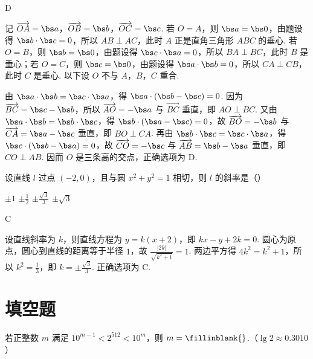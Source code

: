 \begin{answer}
D
\end{answer}

\begin{solution}
记 \(\overrightarrow{OA}=\bs a\)，\(\overrightarrow{OB}=\bs b\)，\(\overrightarrow{OC}=\bs c\). 若 \(O=A\)，则 \(\bs a=\bs0\)，由题设得 \(\bs b\cdot\bs c=0\)，所以 \(AB\perp AC\)，此时 \(A\) 正是直角三角形 \(ABC\) 的垂心. 若 \(O=B\)，则 \(\bs b=\bs0\)，由题设得 \(\bs c\cdot\bs a=0\)，所以 \(BA\perp BC\)，此时 \(B\) 是垂心；若 \(O=C\)，则 \(\bs c=\bs0\)，由题设得 \(\bs a\cdot\bs b=0\)，所以 \(CA\perp CB\)，此时 \(C\) 是垂心. 以下设 \(O\) 不与 \(A\)，\(B\)，\(C\) 重合.

由 \(\bs a\cdot\bs b=\bs c\cdot\bs a\)，得 \(\bs a\cdot(\bs b-\bs c)=0\). 因为 \(\overrightarrow{BC}=\bs c-\bs b\)，所以 \(\overrightarrow{AO}=-\bs a\) 与 \(\overrightarrow{BC}\) 垂直，即 \(AO\perp BC\). 又由 \(\bs a\cdot\bs b=\bs b\cdot\bs c\)，得 \(\bs b\cdot(\bs a-\bs c)=0\)，故 \(\overrightarrow{BO}=-\bs b\) 与 \(\overrightarrow{CA}=\bs a-\bs c\) 垂直，即 \(BO\perp CA\). 再由 \(\bs b\cdot\bs c=\bs c\cdot\bs a\)，得 \(\bs c\cdot(\bs b-\bs a)=0\)，故 \(\overrightarrow{CO}=-\bs c\) 与 \(\overrightarrow{AB}=\bs b-\bs a\) 垂直，即 \(CO\perp AB\). 因而 \(O\) 是三条高的交点，正确选项为 D.
\end{solution}

\begin{problem}
设直线 \(l\) 过点 \((-2,0)\)，且与圆 \(x^{2}+y^{2}=1\) 相切，则 \(l\) 的斜率是（\quad）

\choices
    {\(\pm 1\)}
    {\(\pm \frac{1}{2}\)}
    {\(\pm \frac{\sqrt{3}}{3}\)}
    {\(\pm \sqrt{3}\)}
\end{problem}

\begin{answer}
C
\end{answer}

\begin{solution}
设直线斜率为 \(k\)，则直线方程为 \(y=k(x+2)\)，即 \(kx-y+2k=0\). 圆心为原点，圆心到直线的距离等于半径 \(1\)，故 \(\frac{|2k|}{\sqrt{k^{2}+1}}=1\). 两边平方得 \(4k^{2}=k^{2}+1\)，所以 \(k^{2}=\frac{1}{3}\)，即 \(k=\pm\frac{\sqrt{3}}{3}\). 正确选项为 C.
\end{solution}

\section{填空题}
\begin{problem}
若正整数 \(m\) 满足 \(10^{m-1}<2^{512}<10^{m}\)，则 \(m=\fillinblank{}\).（\(\lg2\approx0.3010\)）
\end{problem}

